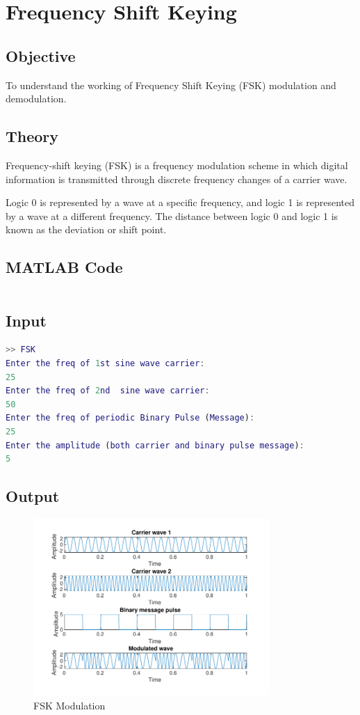 \section{Frequency Shift Keying}
\label{sec:fsk}

\subsection{Objective}

To understand the working of Frequency Shift Keying (FSK) modulation and demodulation.

\subsection{Theory}

Frequency-shift keying (FSK) is a frequency modulation scheme in which digital information is transmitted through discrete frequency changes of a carrier wave.

Logic 0 is represented by a wave at a specific frequency, and logic 1 is represented by a wave at a different frequency. The distance between logic 0 and logic 1 is known as the deviation or shift point.

\subsection{MATLAB Code}

\inputminted[fontsize=\footnotesize,autogobble]{matlab}{code/fsk.m}

\subsection{Input}


\begin{lstlisting}[language=matlab,backgroundcolor=\color{gray!10}]
>> FSK
Enter the freq of 1st sine wave carrier:
25
Enter the freq of 2nd  sine wave carrier:
50
Enter the freq of periodic Binary Pulse (Message):
25
Enter the amplitude (both carrier and binary pulse message):
5
\end{lstlisting}

\subsection{Output}

\begin{figure}[ht]
    \centering
    \includegraphics[width=0.8\textwidth]{res/figures/FSK.pdf}
    \caption{FSK Modulation}
    \label{fig:fsk}
\end{figure}
